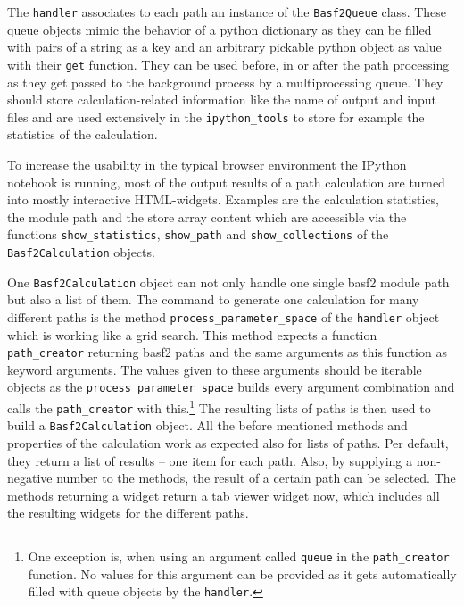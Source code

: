 The \texttt{handler} associates to each path an instance of the \texttt{Basf2Queue} class. These queue objects mimic the behavior of a python dictionary as they can be filled with pairs of a string as a key and an arbitrary pickable python object as value with their \verb+get+ function. They can be used before, in or after the path processing as they get passed to the background process by a multiprocessing queue. They should store calculation-related information like the name of output and input files and are used extensively in the \texttt{ipython\_tools} to store for example the statistics of the calculation.

To increase the usability in the typical browser environment the IPython notebook is running, most of the output results of a path calculation are turned into mostly interactive HTML-widgets. Examples are the calculation statistics, the module path and the store array content which are accessible via the functions \verb+show_statistics+, \verb+show_path+ and \verb+show_collections+ of the \texttt{Basf2Calculation} objects.

One \texttt{Basf2Calculation} object can not only handle one single basf2 module path but also a list of them. The command to generate one calculation for many different paths is the method \verb+process_parameter_space+ of the \texttt{handler} object which is working like a grid search. This method expects a function \verb+path_creator+ returning basf2 paths and the same arguments as this function as keyword arguments. The values given to these arguments should be iterable objects as the \verb+process_parameter_space+ builds every argument combination and calls the \verb+path_creator+ with this.\footnote{One exception is, when using an argument called \texttt{queue} in the \texttt{path\_creator} function. No values for this argument can be provided as it gets automatically filled with queue objects by the \texttt{handler}.} The resulting lists of paths is then used to build a \texttt{Basf2Calculation} object. All the before mentioned methods and properties of the calculation work as expected also for lists of paths. Per default, they return a list of results -- one item for each path. Also, by supplying a non-negative number to the methods, the result of a certain path can be selected. The methods returning a widget return a tab viewer widget now, which includes all the resulting widgets for the different paths.

